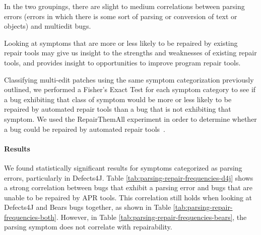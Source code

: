 In the two groupings, there are slight to medium correlations between parsing errors (errors in which there is some sort of parsing or conversion of text or objects) and multiedit bugs.


Looking at symptoms that are more or less likely to be repaired by existing repair tools may give us 
insight to the strengths and weaknesses of existing repair tools, and provides insight to opportunities 
to improve program repair tools.

Classifying multi-edit patches using the same symptom categorization previously outlined, we 
performed a Fisher's Exact Test for each symptom category to see if a bug exhibiting that class of 
symptom would be more or less likely to be repaired by automated repair tools than a bug that is not 
exhibiting that symptom. We used the RepairThemAll experiment in order to determine whether a 
bug could be repaired by automated repair tools~\cite{durieux-repair-them-all}.

\paragraph{Results}
We found statistically significant results for symptoms categorized as parsing errors, particularly in 
Defects4J. Table \ref{tab:parsing-repair-frequencies-d4j} shows a strong correlation between bugs 
that exhibit a parsing error and bugs that are unable to be repaired by APR tools. This correlation 
still holds when looking at Defects4J and Bears bugs together, as shown in Table 
\ref{tab:parsing-repair-frequencies-both}. However, in Table 
\ref{tab:parsing-repair-frequencies-bears}, the parsing symptom does not correlate with 
repairability. 


